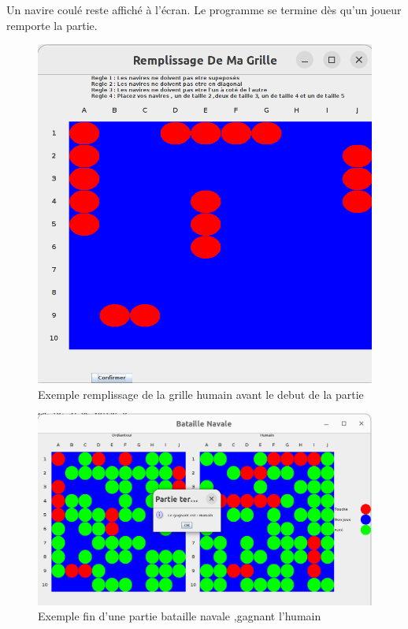 \documentclass{rapport}
\begin{document}
{Un navire coulé reste affiché à l'écran. Le programme se termine dès qu'un joueur remporte la partie.
\begin{figure}[h]
\centering
\includegraphics[scale=0.3]{images/remplissage.png}
\caption{Exemple remplissage de la grille humain avant le debut de la partie }
\end{figure}
\begin{figure}[h]
\centering
\includegraphics[scale=0.3]{images/DemoInterface.png}
\caption{Exemple fin d'une partie bataille navale ,gagnant l'humain}
\end{figure}
}
\end{document}
